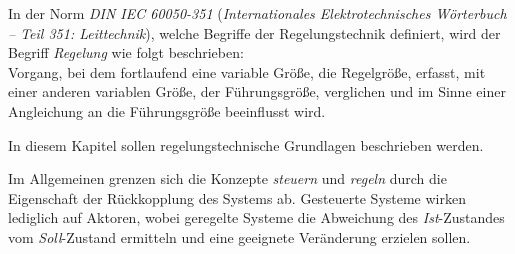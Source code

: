 
In der Norm \textit{DIN IEC 60050-351} (\textit{Internationales Elektrotechnisches Wörterbuch – Teil 351: Leittechnik}), welche Begriffe der Regelungstechnik definiert, wird der Begriff \textit{Regelung} wie folgt beschrieben: \cite{IEC60050-351}\\
\glqq Vorgang, bei dem fortlaufend eine variable Größe, die Regelgröße, erfasst, mit einer anderen variablen Größe, der Führungsgröße, verglichen und im Sinne einer Angleichung an die Führungsgröße beeinflusst wird.\\\grqq 


In diesem Kapitel sollen regelungstechnische Grundlagen beschrieben werden.






Im Allgemeinen grenzen sich die Konzepte \textit{steuern} und \textit{regeln} durch die Eigenschaft der Rückkopplung des Systems ab. Gesteuerte Systeme wirken lediglich auf Aktoren, wobei geregelte Systeme die Abweichung des \textit{Ist}-Zustandes vom \textit{Soll}-Zustand ermitteln und eine geeignete Veränderung erzielen sollen.




